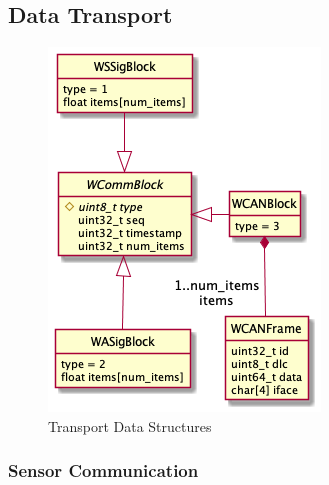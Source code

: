 \documentclass[letterpaper,twocolumn,10pt]{article}
\begin{document}
\subsection{Data Transport}
\begin{figure}[t!]
    \centering
    \includegraphics[width=\linewidth]{out/images/data_structures/data_structures.png}
    \caption{Transport Data Structures}
    \label{fig:ds}
\end{figure}
\subsubsection{Sensor Communication}
\end{document}
